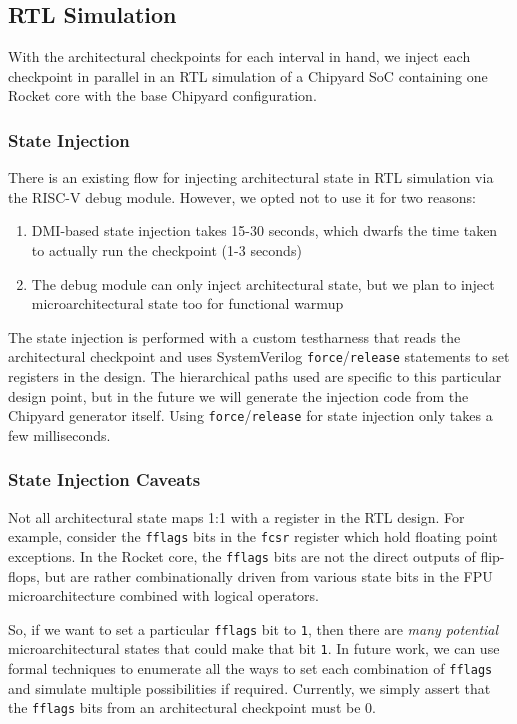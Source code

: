 \documentclass[sigplan,nonacm,10pt]{acmart}
\begin{document}
\subsection{RTL Simulation}

With the architectural checkpoints for each interval in hand, we inject each checkpoint in parallel in an RTL simulation of a Chipyard SoC containing one Rocket core with the base Chipyard configuration.

\subsubsection{State Injection}

There is an existing flow for injecting architectural state in RTL simulation via the RISC-V debug module.
However, we opted not to use it for two reasons:
\begin{enumerate}
  \item DMI-based state injection takes 15-30 seconds, which dwarfs the time taken to actually run the checkpoint (1-3 seconds)
  \item The debug module can only inject architectural state, but we plan to inject microarchitectural state too for functional warmup
\end{enumerate}

The state injection is performed with a custom testharness that reads the architectural checkpoint and uses SystemVerilog \texttt{force}/\texttt{release} statements to set registers in the design.
The hierarchical paths used are specific to this particular design point, but in the future we will generate the injection code from the Chipyard generator itself.
Using \texttt{force}/\texttt{release} for state injection only takes a few milliseconds.

\subsubsection{State Injection Caveats}

Not all architectural state maps 1:1 with a register in the RTL design.
For example, consider the \texttt{fflags} bits in the \texttt{fcsr} register which hold floating point exceptions.
In the Rocket core, the \texttt{fflags} bits are not the direct outputs of flip-flops, but are rather combinationally driven from various state bits in the FPU microarchitecture combined with logical operators.

So, if we want to set a particular \texttt{fflags} bit to \texttt{1}, then there are \textit{many potential} microarchitectural states that could make that bit \texttt{1}.
In future work, we can use formal techniques to enumerate all the ways to set each combination of \texttt{fflags} and simulate multiple possibilities if required.
Currently, we simply assert that the \texttt{fflags} bits from an architectural checkpoint must be 0.
\end{document}
